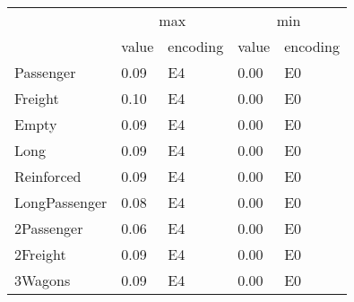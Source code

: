 \begin{tabular}{lllll}
\toprule
 & \multicolumn{2}{c}{max} & \multicolumn{2}{c}{min} \\
 & value & encoding & value & encoding \\
\midrule
Passenger & 0.09 & E4 & 0.00 & E0 \\
Freight & 0.10 & E4 & 0.00 & E0 \\
Empty & 0.09 & E4 & 0.00 & E0 \\
Long & 0.09 & E4 & 0.00 & E0 \\
Reinforced & 0.09 & E4 & 0.00 & E0 \\
LongPassenger & 0.08 & E4 & 0.00 & E0 \\
2Passenger & 0.06 & E4 & 0.00 & E0 \\
2Freight & 0.09 & E4 & 0.00 & E0 \\
3Wagons & 0.09 & E4 & 0.00 & E0 \\
\bottomrule
\end{tabular}
